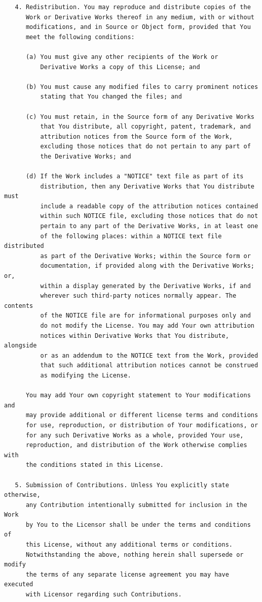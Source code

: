 \documentclass[]{report}
\begin{document}
\begin{verbatim}
   4. Redistribution. You may reproduce and distribute copies of the
      Work or Derivative Works thereof in any medium, with or without
      modifications, and in Source or Object form, provided that You
      meet the following conditions:

      (a) You must give any other recipients of the Work or
          Derivative Works a copy of this License; and

      (b) You must cause any modified files to carry prominent notices
          stating that You changed the files; and

      (c) You must retain, in the Source form of any Derivative Works
          that You distribute, all copyright, patent, trademark, and
          attribution notices from the Source form of the Work,
          excluding those notices that do not pertain to any part of
          the Derivative Works; and

      (d) If the Work includes a "NOTICE" text file as part of its
          distribution, then any Derivative Works that You distribute must
          include a readable copy of the attribution notices contained
          within such NOTICE file, excluding those notices that do not
          pertain to any part of the Derivative Works, in at least one
          of the following places: within a NOTICE text file distributed
          as part of the Derivative Works; within the Source form or
          documentation, if provided along with the Derivative Works; or,
          within a display generated by the Derivative Works, if and
          wherever such third-party notices normally appear. The contents
          of the NOTICE file are for informational purposes only and
          do not modify the License. You may add Your own attribution
          notices within Derivative Works that You distribute, alongside
          or as an addendum to the NOTICE text from the Work, provided
          that such additional attribution notices cannot be construed
          as modifying the License.

      You may add Your own copyright statement to Your modifications and
      may provide additional or different license terms and conditions
      for use, reproduction, or distribution of Your modifications, or
      for any such Derivative Works as a whole, provided Your use,
      reproduction, and distribution of the Work otherwise complies with
      the conditions stated in this License.

   5. Submission of Contributions. Unless You explicitly state otherwise,
      any Contribution intentionally submitted for inclusion in the Work
      by You to the Licensor shall be under the terms and conditions of
      this License, without any additional terms or conditions.
      Notwithstanding the above, nothing herein shall supersede or modify
      the terms of any separate license agreement you may have executed
      with Licensor regarding such Contributions.


\end{verbatim}
\end{document}
